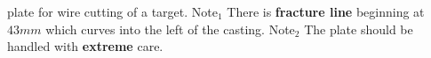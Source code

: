\label{fig:Casting} \MgZnCa plate for wire cutting of a target. Note$_{1}$ There is \textbf{fracture line} beginning at $43mm$ which curves into the left of the casting. Note$_{2}$ The plate should be handled with \textbf{extreme} care.
